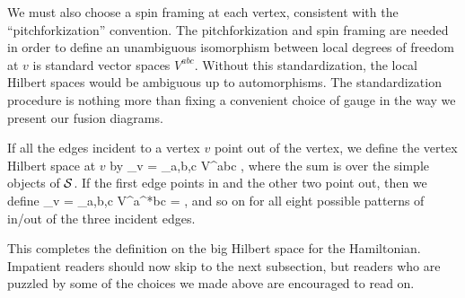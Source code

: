 We must also choose a spin framing at each vertex, consistent with the ``pitchforkization'' convention.
The pitchforkization and spin framing are needed in order to define an unambiguous
isomorphism between local degrees of freedom at $v$ is standard vector spaces $V^{abc}$.
Without this standardization, the local Hilbert spaces would be ambiguous up to automorphisms. 
The standardization procedure is nothing more than fixing a convenient choice of gauge in the way we present our fusion diagrams. 

If all the edges incident to a vertex $v$ point out of the vertex, we define the vertex Hilbert space at $v$ by 
\be
	\mch_v = \bigoplus_{a,b,c} V^{abc}  \quad\quad\quad\quad\quad\quad {},
	\label{pitchfork_basis}
\ee
where the sum is over the simple objects of $\mathcal{S}$.
If the first edge points in and the other two point out, then we define
\be
	\mch_v = \bigoplus_{a,b,c} V^{a^*bc}  \quad\quad\quad\quad\quad\quad {} =  ,
\ee
and so on for all eight possible patterns of in/out of the three incident edges.

\medskip

This completes the definition on the big Hilbert space for the Hamiltonian.
Impatient readers should now skip to the next subsection, but readers who are puzzled by some of the choices we made above 
are encouraged to read on.

\medskip

